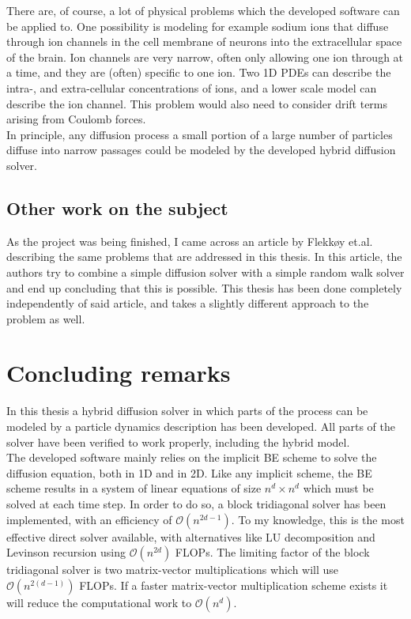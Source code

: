 There are, of course, a lot of physical problems which the developed software can be applied to. 
One possibility is modeling for example sodium ions that diffuse through ion channels in the cell membrane of neurons into the extracellular space of the brain. 
Ion channels are very narrow, often only allowing one ion through at a time, and they are (often) specific to one ion. 
Two 1D PDEs can describe the intra-, and extra-cellular concentrations of ions, and a lower scale model can describe the ion channel. 
This problem would also need to consider drift terms arising from Coulomb forces. \\

In principle, any diffusion process a small portion of a large number of particles diffuse into narrow passages could be modeled by the developed hybrid diffusion solver.

\subsection{Other work on the subject}

As the project was being finished, I came across an article by Flekkøy et.al.\cite{flekkoy2001coupling} describing the same problems that are addressed in this thesis. 
In this article, the authors try to combine a simple diffusion solver with a simple random walk solver and end up concluding that this is possible. 
This thesis has been done completely independently of said article, and takes a slightly different approach to the problem as well. \\



\section{Concluding remarks}

In this thesis a hybrid diffusion solver in which parts of the process can be modeled by a particle dynamics description has been developed. 
All parts of the solver have been verified to work properly, including the hybrid model. \\


The developed software mainly relies on the implicit BE scheme to solve the diffusion equation, both in 1D and in 2D. 
Like any implicit scheme, the BE scheme results in a system of linear equations of size $n^d\times n^d$ which must be solved at each time step. 
In order to do so, a block tridiagonal solver has been implemented, with an efficiency of $\mathcal{O}(n^{2d-1})$. 
To my knowledge, this is the most effective direct solver available, with alternatives like LU decomposition and Levinson recursion using $\mathcal{O}(n^{2d})$ FLOPs. 
The limiting factor of the block tridiagonal solver is two matrix-vector multiplications which will use $\mathcal{O}(n^{2(d-1)})$ FLOPs. 
If a faster matrix-vector multiplication scheme exists it will reduce the computational work to $\mathcal{O}(n^d)$. \\

